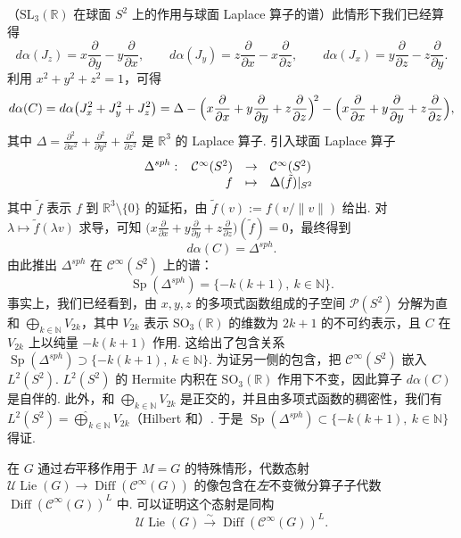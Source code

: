 \begin{example*}
（$\mathrm{SL}_3(\mathbb R)$ 在球面 $S^2$ 上的作用与球面 Laplace 算子的谱）此情形下我们已经算得
\[
d\alpha(J_z)=x\frac{\partial}{\partial y}-y\frac{\partial}{\partial x},\qquad
d\alpha(J_y)=z\frac{\partial}{\partial x}-x\frac{\partial}{\partial z},\qquad
d\alpha(J_x)=y\frac{\partial}{\partial z}-z\frac{\partial}{\partial y}.
\]
利用 $x^2+y^2+z^2=1$，可得
\[
d\alpha(C)=d\alpha\bigl(J_x^2+J_y^2+J_z^2\bigr)
=\Delta-\Bigl(x\frac{\partial}{\partial x}+y\frac{\partial}{\partial y}+z\frac{\partial}{\partial z}\Bigr)^{\!2}
-\Bigl(x\frac{\partial}{\partial x}+y\frac{\partial}{\partial y}+z\frac{\partial}{\partial z}\Bigr),
\]
其中 $\Delta=\frac{\partial^2}{\partial x^2}+\frac{\partial^2}{\partial y^2}+\frac{\partial^2}{\partial z^2}$ 是 $\mathbb R^3$ 的 Laplace 算子. 引入球面 Laplace 算子
\[
\Delta^{sph}:\ \begin{array}[t]{rcl}
\mathcal C^\infty(S^2)&\to&\mathcal C^\infty(S^2)\\
f&\mapsto&\Delta(\tilde f)|_{S^2}
\end{array}
\]
其中 $\tilde f$ 表示 $f$ 到 $\mathbb R^3\setminus\{0\}$ 的延拓，由 $\tilde f(v):=f(v/\|v\|)$ 给出. 对 $\lambda\mapsto\tilde f(\lambda v)$ 求导，可知 $\bigl(x\frac{\partial}{\partial x}+y\frac{\partial}{\partial y}+z\frac{\partial}{\partial z}\bigr)(\tilde f)=0$，最终得到
\[
d\alpha(C)=\Delta^{sph}.
\]
由此推出 $\Delta^{sph}$ 在 $\mathcal C^\infty(S^2)$ 上的谱：
\[
\operatorname{Sp}(\Delta^{sph})=\{-k(k+1),\ k\in\mathbb N\}.
\]
事实上，我们已经看到，由 $x,y,z$ 的多项式函数组成的子空间 $\mathcal P(S^2)$ 分解为直和 $\bigoplus_{k\in\mathbb N}V_{2k}$，其中 $V_{2k}$ 表示 $\mathrm{SO}_3(\mathbb R)$ 的维数为 $2k+1$ 的不可约表示，且 $C$ 在 $V_{2k}$ 上以纯量 $-k(k+1)$ 作用. 这给出了包含关系 $\operatorname{Sp}(\Delta^{sph})\supset\{-k(k+1),\ k\in\mathbb N\}$. 为证另一侧的包含，把 $\mathcal C^\infty(S^2)$ 嵌入 $L^2(S^2)$. $L^2(S^2)$ 的 Hermite 内积在 $\mathrm{SO}_3(\mathbb R)$ 作用下不变，因此算子 $d\alpha(C)$ 是自伴的. 此外，和 $\bigoplus_{k\in\mathbb N}V_{2k}$ 是正交的，并且由多项式函数的稠密性，我们有 $L^2(S^2)=\widehat{\bigoplus}_{k\in\mathbb N}V_{2k}$（Hilbert 和）. 于是 $\operatorname{Sp}(\Delta^{sph})\subset\{-k(k+1),\ k\in\mathbb N\}$ 得证.
\end{example*}

\begin{remark*}
在 $G$ 通过\emph{右}平移作用于 $M=G$ 的特殊情形，代数态射 $\mathcal U\operatorname{Lie}(G)\longrightarrow\operatorname{Diff}(\mathcal C^\infty(G))$ 的像包含在\emph{左}不变微分算子子代数 $\operatorname{Diff}(\mathcal C^\infty(G))^L$ 中. 可以证明这个态射是同构
\[
\mathcal U\operatorname{Lie}(G)\xrightarrow{\ \sim\ }\operatorname{Diff}(\mathcal C^\infty(G))^L.
\]
\end{remark*}

